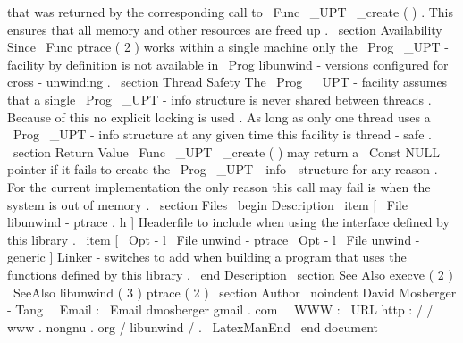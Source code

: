 that
was
returned
by
the
corresponding
call
to
\
Func
{
\
_UPT
\
_create
}
(
)
.
This
ensures
that
all
memory
and
other
resources
are
freed
up
.
\
section
{
Availability
}
Since
\
Func
{
ptrace
}
(
2
)
works
within
a
single
machine
only
the
\
Prog
{
\
_UPT
}
-
facility
by
definition
is
not
available
in
\
Prog
{
libunwind
}
-
versions
configured
for
cross
-
unwinding
.
\
section
{
Thread
Safety
}
The
\
Prog
{
\
_UPT
}
-
facility
assumes
that
a
single
\
Prog
{
\
_UPT
}
-
info
structure
is
never
shared
between
threads
.
Because
of
this
no
explicit
locking
is
used
.
As
long
as
only
one
thread
uses
a
\
Prog
{
\
_UPT
}
-
info
structure
at
any
given
time
this
facility
is
thread
-
safe
.
\
section
{
Return
Value
}
\
Func
{
\
_UPT
\
_create
}
(
)
may
return
a
\
Const
{
NULL
}
pointer
if
it
fails
to
create
the
\
Prog
{
\
_UPT
}
-
info
-
structure
for
any
reason
.
For
the
current
implementation
the
only
reason
this
call
may
fail
is
when
the
system
is
out
of
memory
.
\
section
{
Files
}
\
begin
{
Description
}
\
item
[
\
File
{
libunwind
-
ptrace
.
h
}
]
Headerfile
to
include
when
using
the
interface
defined
by
this
library
.
\
item
[
\
Opt
{
-
l
}
\
File
{
unwind
-
ptrace
}
\
Opt
{
-
l
}
\
File
{
unwind
-
generic
}
]
Linker
-
switches
to
add
when
building
a
program
that
uses
the
functions
defined
by
this
library
.
\
end
{
Description
}
\
section
{
See
Also
}
execve
(
2
)
\
SeeAlso
{
libunwind
(
3
)
}
ptrace
(
2
)
\
section
{
Author
}
\
noindent
David
Mosberger
-
Tang
\
\
Email
:
\
Email
{
dmosberger
gmail
.
com
}
\
\
WWW
:
\
URL
{
http
:
/
/
www
.
nongnu
.
org
/
libunwind
/
}
.
\
LatexManEnd
\
end
{
document
}
